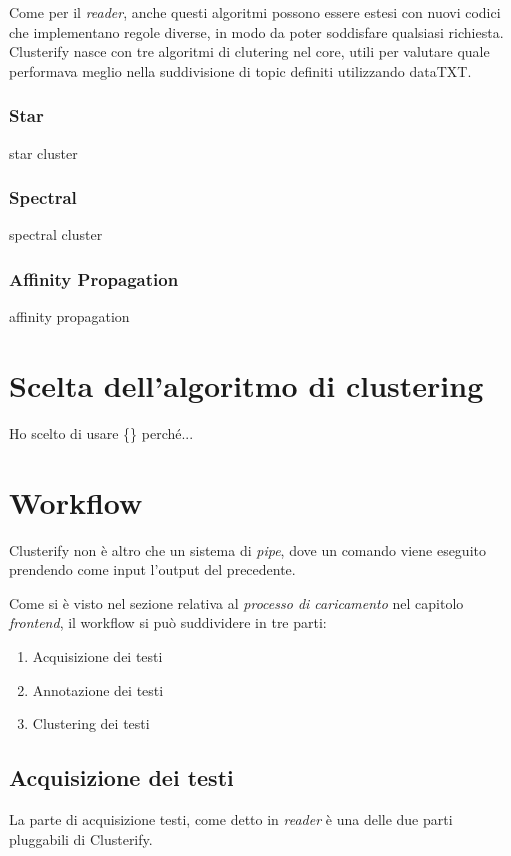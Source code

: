 		Come per il \emph{reader}, anche questi algoritmi possono essere estesi con nuovi codici che implementano regole diverse, in modo da poter soddisfare qualsiasi richiesta. Clusterify nasce con tre algoritmi di clutering nel core, utili per valutare quale performava meglio nella suddivisione di topic definiti utilizzando dataTXT.

		\subsubsection{Star}
			star cluster

		\subsubsection{Spectral}
			spectral cluster

		\subsubsection{Affinity Propagation}
			affinity propagation
		
\section{Scelta dell'algoritmo di clustering}
		Ho scelto di usare \{\} perché...

\section{Workflow}
	Clusterify non è altro che un sistema di \emph{pipe}, dove un comando viene eseguito prendendo come input l'output del precedente.

	Come si è visto nel sezione relativa al \emph{processo di caricamento} nel capitolo \emph{frontend}, il workflow si può suddividere in tre parti:

	\begin{enumerate}
  		\item Acquisizione dei testi
  		\item Annotazione dei testi
 		\item Clustering dei testi
	\end{enumerate} 
	
	\subsection{Acquisizione dei testi}
		La parte di acquisizione testi, come detto in \emph{reader} è una delle due parti pluggabili di Clusterify.

